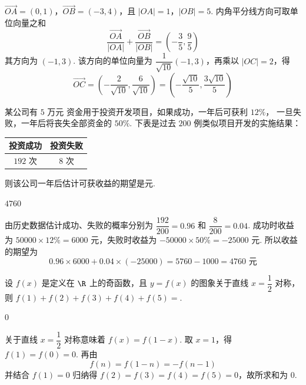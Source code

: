 \begin{solution}
\(\overrightarrow{OA}=(0,1)\)，\(\overrightarrow{OB}=(-3,4)\)，且 \(|OA|=1\)，\(|OB|=5\).
内角平分线方向可取单位向量之和
\[
\frac{\overrightarrow{OA}}{|OA|}+\frac{\overrightarrow{OB}}{|OB|}
=\left(-\frac35,\frac95\right)
\]
其方向为 \((-1,3)\). 该方向的单位向量为
\(\dfrac1{\sqrt{10}}(-1,3)\)，再乘以 \(|OC|=2\)，得
\[
\overrightarrow{OC}
=\left(-\frac2{\sqrt{10}},\frac6{\sqrt{10}}\right)
=\left(-\frac{\sqrt{10}}5,\frac{3\sqrt{10}}5\right)
\]
\end{solution}

\begin{problem}
某公司有 \(5\text{ 万元}\) 资金用于投资开发项目，如果成功，一年后可获利 \(12\%\)，
一旦失败，一年后将丧失全部资金的 \(50\%\). 下表是过去 \(200\) 例类似项目开发的实施结果：

\begin{center}
\begin{tabular}{|c|c|}
\hline
投资成功 & 投资失败 \\
\hline
\(192\) 次 & \(8\) 次 \\
\hline
\end{tabular}
\end{center}

则该公司一年后估计可获收益的期望是\fillinblank{}\(\text{元}\).
\end{problem}

\begin{answer}
\(4760\)
\end{answer}

\begin{solution}
由历史数据估计成功、失败的概率分别为
\(\dfrac{192}{200}=0.96\) 和 \(\dfrac8{200}=0.04\). 成功时收益为
\(50000\times12\%=6000\) 元，失败时收益为
\(-50000\times50\%=-25000\) 元. 所以收益的期望为
\[
0.96\times6000+0.04\times(-25000)=5760-1000=4760\text{ 元}
\]
\end{solution}

\begin{problem}
设 \(f(x)\) 是定义在 \(\R\) 上的奇函数，且 \(y=f(x)\) 的图象关于直线
\(x=\dfrac12\) 对称，则
\(f(1)+f(2)+f(3)+f(4)+f(5)=\)\fillinblank{}.
\end{problem}

\begin{answer}
\(0\)
\end{answer}

\begin{solution}
关于直线 \(x=\dfrac12\) 对称意味着 \(f(x)=f(1-x)\). 取 \(x=1\)，得
\(f(1)=f(0)=0\). 再由
\[
f(n)=f(1-n)=-f(n-1)
\]
并结合 \(f(1)=0\) 归纳得 \(f(2)=f(3)=f(4)=f(5)=0\)，故所求和为 \(0\).
\end{solution}


